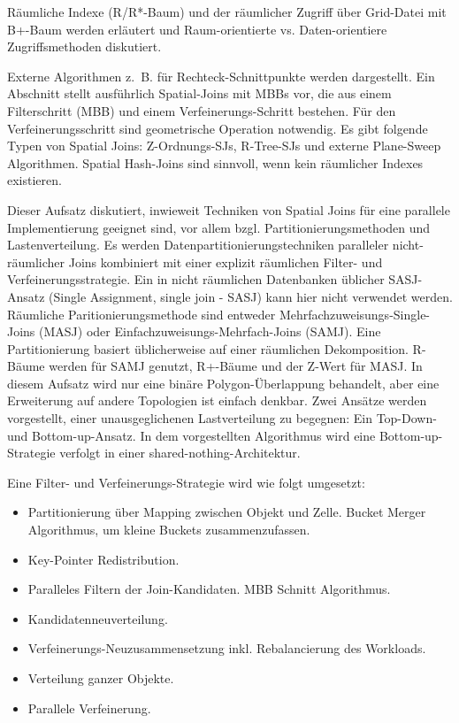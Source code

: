 \documentclass[a4paper,12pt,twoside]{article}
\begin{document}
Räumliche Indexe (R/R*-Baum) und der räumlicher Zugriff über Grid-Datei mit B+-Baum werden erläutert und Raum-orientierte vs. Daten-orientiere Zugriffsmethoden diskutiert. 

Externe Algorithmen z.~B. für Rechteck-Schnittpunkte werden dargestellt. Ein Abschnitt stellt ausführlich Spatial-Joins mit MBBs vor, die aus einem Filterschritt (MBB) und einem Verfeinerungs-Schritt bestehen. Für den Verfeinerungsschritt sind geometrische Operation notwendig. Es gibt folgende Typen von Spatial Joins: Z-Ordnungs-SJs, R-Tree-SJs und externe Plane-Sweep Algorithmen. Spatial Hash-Joins sind sinnvoll, wenn kein räumlicher Indexes existieren.

\textbf{}

Dieser Aufsatz diskutiert, inwieweit Techniken von Spatial Joins für eine parallele Implementierung geeignet sind, vor allem bzgl. Partitionierungsmethoden und Lastenverteilung. Es werden Daten\-partitionierungs\-techniken paralleler nicht-räumlicher Joins kombiniert mit einer explizit räumlichen Filter- und Verfeinerungsstrategie. Ein in nicht räumlichen Datenbanken üblicher SASJ-Ansatz (Single Assignment, single join - SASJ) kann hier nicht verwendet werden. Räumliche Paritionierungsmethode sind entweder Mehrfachzuweisungs-Single-Joins (MASJ) oder Einfachzuweisungs-Mehrfach-Joins (SAMJ). Eine Partitionierung basiert üblicherweise auf einer räumlichen Dekomposition. R-Bäume werden für SAMJ genutzt, R+-Bäume und der Z-Wert für MASJ. In diesem Aufsatz wird nur eine binäre Polygon-Überlappung behandelt, aber eine Erweiterung auf andere Topologien ist einfach denkbar. Zwei Ansätze werden vorgestellt, einer unausgeglichenen Lastverteilung zu begegnen: Ein Top-Down- und Bottom-up-Ansatz. In dem vorgestellten Algorithmus wird eine Bottom-up-Strategie verfolgt in einer shared-nothing-Architektur.

Eine Filter- und Verfeinerungs-Strategie wird wie folgt umgesetzt:

\begin{itemize}
	 \item Partitionierung über Mapping zwischen Objekt und Zelle. Bucket Merger Algorithmus, um kleine Buckets zusammenzufassen. 
	 \item Key-Pointer Redistribution.
	 \item Paralleles Filtern der Join-Kandidaten. MBB Schnitt Algorithmus.
	 \item Kandidatenneuverteilung.
	 \item Verfeinerungs-Neuzusammensetzung inkl. Rebalancierung des Workloads.
	 \item Verteilung ganzer Objekte. 
	 \item Parallele Verfeinerung.
 \end{itemize}
\end{document}
